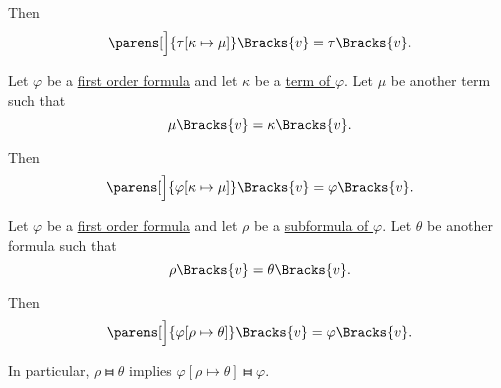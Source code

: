 \begin{proposition}
\begin{thmenum}
    Then
    \begin{equation}\label{eq:thm:first_order_substitution_equivalence/term_in_term}
      \parens[\Big]{ \tau[\kappa \mapsto \mu] }\Bracks{v} = \tau\Bracks{v}.
    \end{equation}

     Let \( \varphi \) be a \hyperref[def:first_order_syntax/formula]{first order formula} and let \( \kappa \) be a \hyperref[def:first_order_syntax/formula_terms]{term of \( \varphi \)}. Let \( \mu \) be another term such that
    \begin{equation}\label{eq:thm:first_order_substitution_equivalence/term_in_formula/compatibility}
      \mu\Bracks{v} = \kappa\Bracks{v}.
    \end{equation}

    Then
    \begin{equation}\label{eq:thm:first_order_substitution_equivalence/term_in_formula}
      \parens[\Big]{ \varphi[\kappa \mapsto \mu] }\Bracks{v} = \varphi\Bracks{v}.
    \end{equation}

     Let \( \varphi \) be a \hyperref[def:first_order_syntax/formula]{first order formula} and let \( \rho \) be a \hyperref[def:first_order_syntax/subformula]{subformula of \( \varphi \)}. Let \( \theta \) be another formula such that
    \begin{equation}\label{eq:thm:first_order_substitution_equivalence/formula_in_formula/compatibility}
      \rho\Bracks{v} = \theta\Bracks{v}.
    \end{equation}

    Then
    \begin{equation}\label{eq:thm:first_order_substitution_equivalence/formula_in_formula}
      \parens[\Big]{ \varphi[\rho \mapsto \theta] }\Bracks{v} = \varphi\Bracks{v}.
    \end{equation}

    In particular, \( \rho \gleichstark \theta \) implies \( \varphi[\rho \mapsto \theta] \gleichstark \varphi \).
  \end{thmenum}
\end{proposition}
